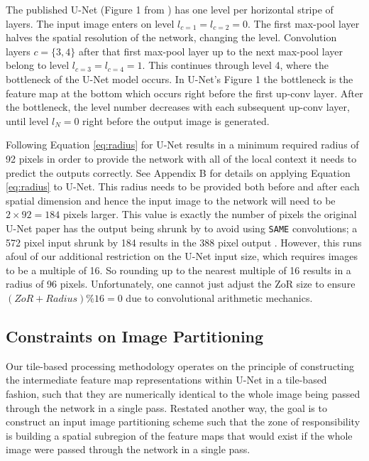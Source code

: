 \documentclass[runningheads]{llncs}
\begin{document}
The published U-Net (Figure 1 from \cite{Ronneberger2015a}) has one level per horizontal stripe of layers. The input image enters on level $l_{c=1} = l_{c=2} = 0$. The first max-pool layer halves the spatial resolution of the network, changing the level. Convolution layers $c = \{3, 4\}$ after that first max-pool layer up to the next max-pool layer belong to level $l_{c=3}=l_{c=4} = 1$. This continues through level 4, where the bottleneck of the U-Net model occurs. In U-Net's Figure 1 the bottleneck is the feature map at the bottom which occurs right before the first up-conv layer. After the bottleneck, the level number decreases with each subsequent up-conv layer, until level $l_{N} = 0$ right before the output image is generated. 

Following Equation \ref{eq:radius} 
for U-Net results in a minimum required radius of 92 pixels in order to provide the network with all of the local context it needs to predict the outputs correctly. See Appendix B for details on applying Equation \ref{eq:radius} to U-Net. This radius needs to be provided both before and after each spatial dimension and hence the input image to the network will need to be $2 \times 92 = 184$ pixels larger. This value is exactly the number of pixels the original U-Net paper has the output being shrunk by to avoid using \texttt{SAME} convolutions; a 572 pixel input shrunk by 184 results in the 388 pixel output \cite{Ronneberger2015a}. 
However, this runs afoul of our additional restriction on the U-Net input size, which requires images to be a multiple of 16. So rounding up to the nearest multiple of 16 results in a radius of 96 pixels. Unfortunately, one cannot just adjust the ZoR size to ensure $(ZoR + Radius) \% 16 = 0$ due to convolutional arithmetic mechanics. 

\subsection{Constraints on Image Partitioning}

Our tile-based processing methodology operates on the principle of constructing the intermediate feature map representations within U-Net in a tile-based fashion, such that they are numerically identical to the whole image being passed through the network in a single pass. Restated another way, the goal is to construct an input image partitioning scheme such that the zone of responsibility is building a spatial subregion of the feature maps that would exist if the whole image were passed through the network in a single pass. 
\end{document}
